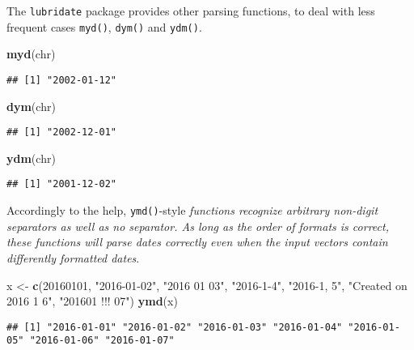 \documentclass[]{book}
\newenvironment{Shaded}{\begin{snugshade}}{\end{snugshade}}
\newcommand{\KeywordTok}[1]{\textcolor[rgb]{0.13,0.29,0.53}{\textbf{{#1}}}}
\newcommand{\DecValTok}[1]{\textcolor[rgb]{0.00,0.00,0.81}{{#1}}}
\newcommand{\StringTok}[1]{\textcolor[rgb]{0.31,0.60,0.02}{{#1}}}
\newcommand{\NormalTok}[1]{{#1}}
\begin{document}
The \texttt{lubridate} package provides other parsing functions, to deal
with less frequent cases \texttt{myd()}, \texttt{dym()} and
\texttt{ydm()}.

\begin{Shaded}
\begin{Highlighting}[]
\KeywordTok{myd}\NormalTok{(chr)}
\end{Highlighting}
\end{Shaded}

\begin{verbatim}
## [1] "2002-01-12"
\end{verbatim}

\begin{Shaded}
\begin{Highlighting}[]
\KeywordTok{dym}\NormalTok{(chr)}
\end{Highlighting}
\end{Shaded}

\begin{verbatim}
## [1] "2002-12-01"
\end{verbatim}

\begin{Shaded}
\begin{Highlighting}[]
\KeywordTok{ydm}\NormalTok{(chr)}
\end{Highlighting}
\end{Shaded}

\begin{verbatim}
## [1] "2001-12-02"
\end{verbatim}

Accordingly to the help, \texttt{ymd()}-style \emph{functions recognize
arbitrary non-digit separators as well as no separator. As long as the
order of formats is correct, these functions will parse dates correctly
even when the input vectors contain differently formatted dates}.

\begin{Shaded}
\begin{Highlighting}[]
\NormalTok{x <-}\StringTok{ }\KeywordTok{c}\NormalTok{(}\DecValTok{20160101}\NormalTok{, }\StringTok{"2016-01-02"}\NormalTok{, }\StringTok{"2016 01 03"}\NormalTok{, }\StringTok{"2016-1-4"}\NormalTok{, }\StringTok{"2016-1, 5"}\NormalTok{, }
       \StringTok{"Created on 2016 1 6"}\NormalTok{, }\StringTok{"201601 !!! 07"}\NormalTok{)}
\KeywordTok{ymd}\NormalTok{(x)}
\end{Highlighting}
\end{Shaded}

\begin{verbatim}
## [1] "2016-01-01" "2016-01-02" "2016-01-03" "2016-01-04" "2016-01-05" "2016-01-06" "2016-01-07"
\end{verbatim}
\end{document}
